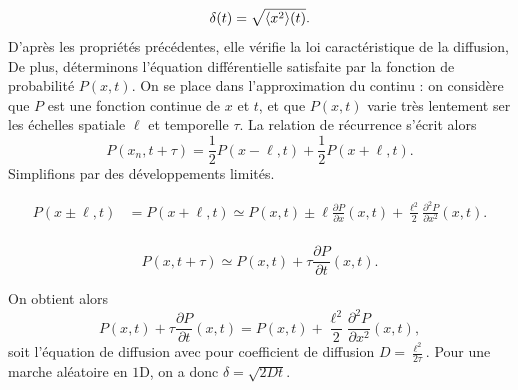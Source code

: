 \documentclass[12pt,fancy]{cours}
\begin{document}
\begin{equation}
  \delta(t) = \sqrt{\left\langle {x^2} \right\rangle\!(t)}.
\end{equation}
D'après les propriétés précédentes, elle vérifie la loi caractéristique de la diffusion,
De plus, déterminons l'équation différentielle satisfaite par la fonction de probabilité $P(x,t)$. On se place dans l'approximation du continu : on considère que $P$ est une fonction continue de $x$ et $t$, et que $P(x,t)$ varie très lentement ser les échelles spatiale $\ell$ et temporelle $\tau$.  La relation de récurrence s'écrit alors 
\begin{equation}
\label{eq:p(xn,t)}
P(x_n,t+\tau)=\frac{1}{2}P(x -\ell, t)+\frac{1}{2}P(x + \ell,t).
\end{equation}
Simplifions par des développements limités.
\begin{liste}
  \item {} 
  \begin{equation}
  \begin{split}
  P(x \pm \ell,t)&= P(x+\ell,t)\simeq P(x,t)\pm \ell\frac{\partial P}{\partial x}(x,t)+\frac{\ell^2}{2}\frac{\partial^2 P}{\partial x^2}(x,t).\\
  \end{split}
  \end{equation}
  \item {}
  \begin{equation}
  P(x,t+\tau)\simeq P(x,t)+\tau\frac{\partial P}{\partial t}(x,t).
  \end{equation}
\end{liste}
On obtient alors 
\begin{equation}
  P(x,t)+\tau\frac{\partial P}{\partial t}(x,t) = P(x,t) + \frac{\ell^2}{2}\frac{\partial^2 P}{\partial x^2}(x,t),
\end{equation}
soit l'équation de diffusion 
avec pour coefficient de diffusion $D=\frac{\ell^2}{2\tau}$.  Pour une marche aléatoire en $1$D, on a donc $\delta = \sqrt{2Dt}$.


\end{document}
